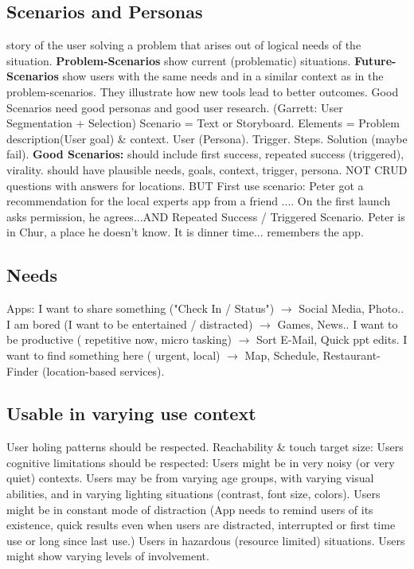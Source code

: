 \subsection{Scenarios and Personas}
story of the user solving a problem that arises out of logical needs of the situation.
\textbf{Problem-Scenarios} show current (problematic) situations.
\textbf{Future-Scenarios} show users with the same needs and in a similar context as in the problem-scenarios. They illustrate how new tools lead to better outcomes.
Good Scenarios need good personas and good user research. (Garrett: User Segmentation + Selection)
Scenario = Text or Storyboard.
Elements = Problem description(User goal) \& context. User (Persona). Trigger. Steps. Solution (maybe fail).
\textbf{Good Scenarios:} 
should include first success, repeated success (triggered), virality. should have plausible needs, goals, context, trigger, persona. NOT CRUD questions with answers for locations. BUT First use scenario: Peter got a recommendation for the local experts app from a friend .... On the first launch asks permission, he agrees...AND Repeated Success / Triggered Scenario. Peter is in Chur, a place he doesn't know. It is dinner time... remembers the app.
\subsection{Needs}
Apps: I want to share something ("Check In / Status") $\rightarrow$ Social Media, Photo..
I am bored (I want to be entertained / distracted) $\rightarrow$ Games, News..
I want to be productive ( repetitive now, micro tasking) $\rightarrow$ Sort E-Mail, Quick ppt edits.
I want to find something here ( urgent, local) $\rightarrow$ Map, Schedule, Restaurant-Finder (location-based services).

\subsection{Usable in varying use context}
User holing patterns should be respected. Reachability \& touch target size:
Users cognitive limitations should be respected:
Users might be in very noisy (or very quiet) contexts.
Users may be from varying age groups, with varying visual abilities, and in varying lighting situations (contrast, font size, colors).
Users might be in constant mode of distraction (App needs to remind users of its existence, quick results even when users are distracted, interrupted or first time use or long since last use.)
Users in hazardous (resource limited) situations.
Users might show varying levels of involvement.

